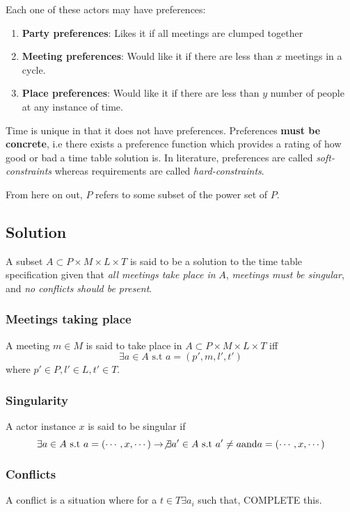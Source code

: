 \documentclass[11pt]{book}
\begin{document}
Each one of these actors may have preferences:
\begin{enumerate}

  \item \textbf{Party preferences}: Likes it if all meetings are clumped together 
  \item \textbf{Meeting preferences}: Would like it if there are less than $x$ meetings in a cycle.
  \item \textbf{Place preferences}: Would like it if there are less than $y$ number of people at any instance of time.
\end{enumerate}
Time is unique in that it does not have preferences. Preferences \textbf{must be concrete}, i.e there exists a preference function which provides a rating of how good or bad a time table solution is. In literature, preferences are called \textit{soft-constraints} whereas requirements are called \textit{hard-constraints}.

From here on out, $P$ refers to some subset of the power set of  $P$.

\subsection{Solution}
A subset $A\subset P\times M \times L \times  T$ is said to be a solution to the time table specification given that \textit{all meetings take place in} $A$, \textit{meetings must be singular}, and \textit{no conflicts should be present}.

\subsubsection{Meetings taking place}
A meeting $m\in M$ is said to take place in $A\subset P\times M \times L \times T$ iff $$\exists a\in A \text{ s.t } a = (p', m, l', t')$$ where $p'\in P, l' \in L, t' \in T$.

\subsubsection{Singularity}
A actor instance $x$ is said to be singular if $$\exists a\in A \text{ s.t } a = (\cdots, x, \cdots) \to \not\exists a'\in A \text{ s.t } a' \neq a \text{and} a = (\cdots, x, \cdots)$$

\subsubsection{Conflicts}
A conflict is a situation where for a $t\in T \exists {a_i}$ such that,
 COMPLETE this.
\end{document}
